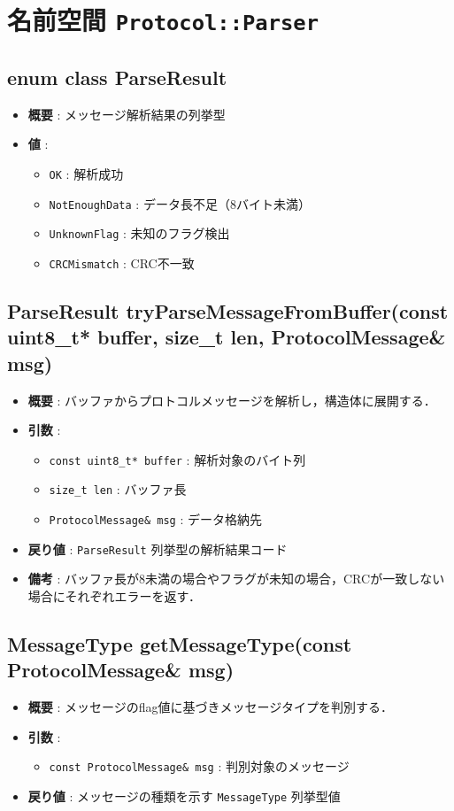 \documentclass[a4paper,12pt]{article}
\begin{document}
\section{名前空間 \texttt{Protocol::Parser}}

\subsection{enum class ParseResult}
\begin{itemize}
  \item \textbf{概要} : メッセージ解析結果の列挙型
  \item \textbf{値} :
  \begin{itemize}
    \item \texttt{OK} : 解析成功
    \item \texttt{NotEnoughData} : データ長不足（8バイト未満）
    \item \texttt{UnknownFlag} : 未知のフラグ検出
    \item \texttt{CRCMismatch} : CRC不一致
  \end{itemize}
\end{itemize}

\subsection{ParseResult tryParseMessageFromBuffer(const uint8\_t* buffer, size\_t len, ProtocolMessage\& msg)}
\begin{itemize}
  \item \textbf{概要} : バッファからプロトコルメッセージを解析し，構造体に展開する．
  \item \textbf{引数} :
  \begin{itemize}
    \item \texttt{const uint8\_t* buffer} : 解析対象のバイト列
    \item \texttt{size\_t len} : バッファ長
    \item \texttt{ProtocolMessage\& msg} : データ格納先
  \end{itemize}
  \item \textbf{戻り値} : \texttt{ParseResult} 列挙型の解析結果コード
  \item \textbf{備考} : バッファ長が8未満の場合やフラグが未知の場合，CRCが一致しない場合にそれぞれエラーを返す．
\end{itemize}

\subsection{MessageType getMessageType(const ProtocolMessage\& msg)}
\begin{itemize}
  \item \textbf{概要} : メッセージのflag値に基づきメッセージタイプを判別する．
  \item \textbf{引数} :
  \begin{itemize}
    \item \texttt{const ProtocolMessage\& msg} : 判別対象のメッセージ
  \end{itemize}
  \item \textbf{戻り値} : メッセージの種類を示す \texttt{MessageType} 列挙型値
\end{itemize}
\end{document}
